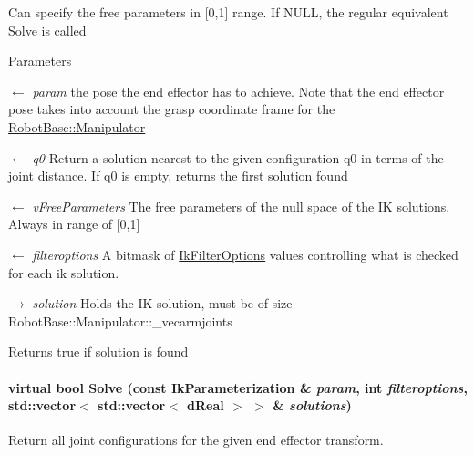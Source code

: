 Can specify the free parameters in \mbox{[}0,1\mbox{]} range. If NULL, the regular equivalent Solve is called 
\begin{DoxyParams}{Parameters}
\item[\mbox{$\leftarrow$} {\em param}]the pose the end effector has to achieve. Note that the end effector pose takes into account the grasp coordinate frame for the \hyperlink{classOpenRAVE_1_1RobotBase_1_1Manipulator}{RobotBase::Manipulator} \item[\mbox{$\leftarrow$} {\em q0}]Return a solution nearest to the given configuration q0 in terms of the joint distance. If q0 is empty, returns the first solution found \item[\mbox{$\leftarrow$} {\em vFreeParameters}]The free parameters of the null space of the IK solutions. Always in range of \mbox{[}0,1\mbox{]} \item[\mbox{$\leftarrow$} {\em filteroptions}]A bitmask of \hyperlink{namespaceOpenRAVE_a89401ff7c557d6d1ede96b550fb22bdc}{IkFilterOptions} values controlling what is checked for each ik solution. \item[\mbox{$\rightarrow$} {\em solution}]Holds the IK solution, must be of size RobotBase::Manipulator::\_\-vecarmjoints \end{DoxyParams}
\begin{DoxyReturn}{Returns}
true if solution is found 
\end{DoxyReturn}
\hypertarget{classOpenRAVE_1_1IkSolverBase_ae0819c42f7769a51d4ff0179c0de1d4b}{
\paragraph[{Solve}]{\setlength{\rightskip}{0pt plus 5cm}virtual bool Solve (const {\bf IkParameterization} \& {\em param}, \/  int {\em filteroptions}, \/  std::vector$<$ std::vector$<$ dReal $>$ $>$ \& {\em solutions})}\hfill}
\label{classOpenRAVE_1_1IkSolverBase_ae0819c42f7769a51d4ff0179c0de1d4b}


Return all joint configurations for the given end effector transform. 


